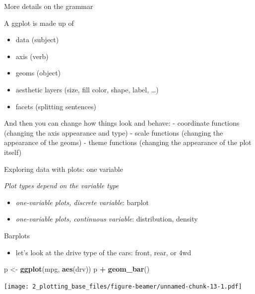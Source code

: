 \documentclass[
  ignorenonframetext,
]{beamer}
\newenvironment{Shaded}{\begin{snugshade}}{\end{snugshade}}
\newcommand{\KeywordTok}[1]{\textcolor[rgb]{0.13,0.29,0.53}{\textbf{#1}}}
\newcommand{\NormalTok}[1]{#1}
\newcommand{\OperatorTok}[1]{\textcolor[rgb]{0.81,0.36,0.00}{\textbf{#1}}}
\newcommand{\StringTok}[1]{\textcolor[rgb]{0.31,0.60,0.02}{#1}}
\providecommand{\tightlist}{%
  \setlength{\itemsep}{0pt}\setlength{\parskip}{0pt}}
\begin{document}
\begin{frame}{More details on the grammar}
\protect\hypertarget{more-details-on-the-grammar}{}

A ggplot is made up of

\begin{itemize}
\tightlist
\item
  data (subject)
\item
  axis (verb)
\item
  geoms (object)
\item
  aesthetic layers (size, fill color, shape, label, \ldots)
\item
  facets (splitting sentences)
\end{itemize}

And then you can change how things look and behave: - coordinate
functions (changing the axis appearance and type) - scale functions
(changing the appearance of the geoms) - theme functions (changing the
appearance of the plot itself)

\end{frame}

\begin{frame}{Exploring data with plots: one variable}
\protect\hypertarget{exploring-data-with-plots-one-variable}{}

\emph{Plot types depend on the variable type}

\begin{itemize}
\tightlist
\item
  \emph{one-variable plots, discrete variable}: barplot
\item
  \emph{one-variable plots, continuous variable}: distribution, density
\end{itemize}

\end{frame}

\begin{frame}[fragile]{Barplots}
\protect\hypertarget{barplots}{}

\begin{itemize}
\tightlist
\item
  let's look at the drive type of the cars: front, rear, or 4wd
\end{itemize}

\begin{Shaded}
\begin{Highlighting}[]
\NormalTok{p <-}\StringTok{ }\KeywordTok{ggplot}\NormalTok{(mpg, }\KeywordTok{aes}\NormalTok{(drv))}
\NormalTok{p }\OperatorTok{+}\StringTok{ }\KeywordTok{geom_bar}\NormalTok{()}
\end{Highlighting}
\end{Shaded}

\texttt{[image: 2\_plotting\_base\_files/figure-beamer/unnamed-chunk-13-1.pdf]}

\end{frame}
\end{document}
